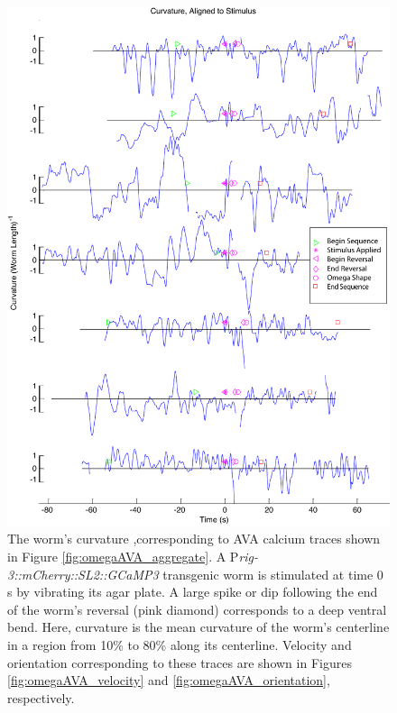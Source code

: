 \begin{figure}  %
\includegraphics[width=\textwidth]{figures/omegaAVA_curvature}
\caption[Corresponding curvature for seven sequences from four worms.]{The worm's curvature ,corresponding to AVA calcium traces shown in Figure \ref{fig:omegaAVA_aggregate}. A P\textit{rig-3::mCherry::SL2::GCaMP3} transgenic worm is stimulated at time 0 s by vibrating its agar plate. A large spike or dip following the end of the worm's reversal (pink diamond) corresponds to a deep ventral bend. Here, curvature is the mean curvature of the worm's centerline in a region from 10\% to 80\% along its centerline. 
Velocity and orientation corresponding to these traces are shown in Figures \ref{fig:omegaAVA_velocity} and \ref{fig:omegaAVA_orientation}, respectively.  \label{fig:omegaAVA_curvature}}
\end{figure}


